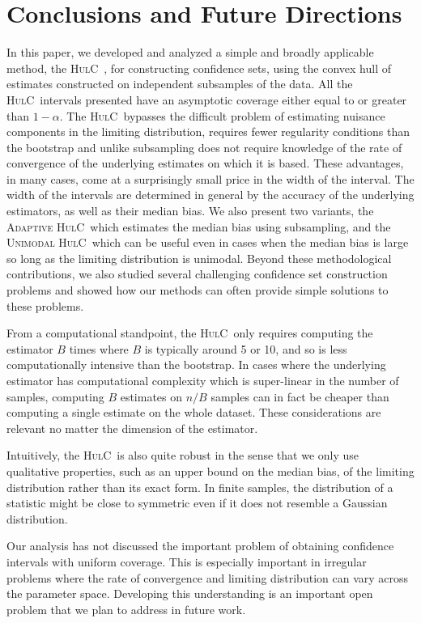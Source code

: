 \documentclass{article}
\newcommand{\hulc}{\textsc{HulC}~}
\newcommand{\ahulc}{\textsc{Adaptive HulC}~}
\newcommand{\uhulc}{\textsc{Unimodal HulC}~}
\numberwithin{myalgctr}{section}
\begin{document}
\section{Conclusions and Future Directions}\label{sec:conclusions}
In this paper, we developed and analyzed a simple and broadly applicable method, the \hulc, 
for constructing confidence sets, using the convex hull of estimates constructed on independent subsamples
of the data. 
{\color{black}All the \hulc intervals presented have an asymptotic coverage either equal to or greater than $1-\alpha$.}
The \hulc bypasses the difficult problem of estimating nuisance components in the limiting distribution,
requires fewer regularity conditions than the bootstrap and unlike subsampling 
does not require knowledge of the rate of convergence of the underlying estimates on which it is based. 
These advantages, in many cases, come at a surprisingly small price in the width of the interval. The width of the intervals
are determined in general by the accuracy of the underlying estimators, as well as their median bias. 
We also present two variants, 
the \ahulc which estimates the median bias using subsampling, and the \uhulc which can be useful even in cases when the median bias is large so
long as the limiting distribution
is unimodal. Beyond these methodological contributions, we also studied several challenging confidence set construction problems 
and showed how our methods can often provide simple solutions to these problems. 

From a computational standpoint, the \hulc only requires
computing the estimator $B$ times where $B$ is typically around 5 or
10, and so is less computationally intensive than the bootstrap. In cases where the underlying estimator has computational 
complexity which is super-linear in the number of samples, computing $B$ estimates on $n/B$ samples can in fact be cheaper
than computing a single estimate on the whole dataset. {\color{black}These considerations are relevant no matter the dimension of the estimator.}

Intuitively, the \hulc is also quite robust in the sense that we only use
qualitative properties, such as an upper bound on the median bias, of the
limiting distribution rather than its exact form. In finite samples, the
distribution of a statistic might be close to symmetric
even if it does not resemble a Gaussian distribution. 

Our analysis has not discussed the important problem
of obtaining confidence intervals with uniform coverage.
This is especially
important in irregular problems
where the rate of convergence
and limiting distribution can vary
across the parameter space. Developing this understanding is an important open problem that 
we plan to address in future work.
\end{document}
